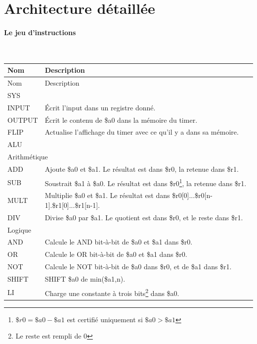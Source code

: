\documentclass{article}
\begin{document}
\section{Architecture détaillée}

\paragraph{Le jeu d'instructions}~
\begin{savenotes}
\begin{longtable}{|l|l|}
  
  \hline
  Nom & Description \\
  \endfirsthead
  \hline
  Nom & Description \\
  \hline\hline
  \endhead


  \hline\hline
  \multicolumn{2}{|l|}{SYS} \\
  \hline
  INPUT  & \'Ecrit l'input dans un registre donné. \\
  OUTPUT & \'Ecrit le contenu de \$a0 dans la mémoire du timer. \\
  FLIP   & Actualise l'affichage du timer avec ce qu'il y a dans sa mémoire. \\
  
  \hline\hline
  \multicolumn{2}{|l|}{ALU} \\
  \hline
  \multicolumn{2}{|l|}{Arithmétique} \\
  \hline
  ADD   & Ajoute \$a0 et \$a1. Le résultat est dans \$r0, la retenue dans \$r1. \\
  SUB   & Soustrait \$a1 à \$a0. Le résultat est dans \$r0\footnote{$\$r0=\$a0-\$a1$ est certifié uniquement si $\$a0>\$a1$}, la retenue dans \$r1. \\
  MULT  & Multiplie \$a0 et \$a1. Le résultat est dans \$r0[0]...\$r0[n-1].\$r1[0]...\$r1[n-1].\\
  DIV   & Divise \$a0 par \$a1. Le quotient est dans \$r0, et le reste dans \$r1. \\
  \hline
  \multicolumn{2}{|l|}{Logique} \\
  \hline
  AND   & Calcule le AND bit-à-bit de \$a0 et \$a1 dans \$r0. \\
  OR    & Calcule le OR bit-à-bit de \$a0 et \$a1 dans \$r0. \\
  NOT   & Calcule le NOT bit-à-bit de \$a0 dans \$r0, et de \$a1 dans \$r1. \\
  SHIFT & SHIFT \$a0 de min(\$a1,n). \\
  \hline
  LI    & Charge une constante à trois bits\footnote{Le reste est rempli de 0} dans \$a0. \\
  

\end{longtable}
\end{savenotes}
\end{document}
